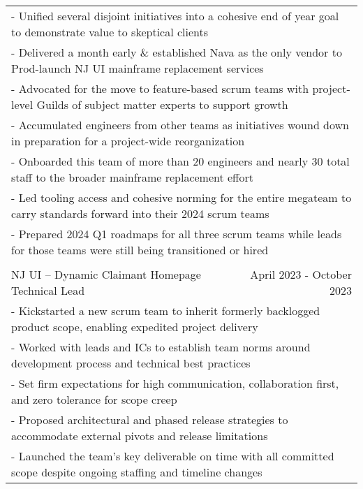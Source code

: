 \documentclass[letterpaper]{article}
\begin{document}
\begin{center}
\begin{tabular}{p{}p{}r}
			  \multicolumn{3}{p{\textwidth}}{\quad\quad - Unified several disjoint initiatives into a cohesive end of year goal to demonstrate value to skeptical clients} \\
			  \multicolumn{3}{p{\textwidth}}{\quad\quad - Delivered a month early \& established Nava as the only vendor to Prod-launch NJ UI mainframe replacement services} \\
			  \multicolumn{3}{p{\textwidth}}{\quad\quad - Advocated for the move to feature-based scrum teams with project-level Guilds of subject matter experts to support growth} \\
			  \multicolumn{3}{p{\textwidth}}{\quad\quad - Accumulated engineers from other teams as initiatives wound down in preparation for a project-wide reorganization} \\
			  \multicolumn{3}{p{\textwidth}}{\quad\quad - Onboarded this team of more than 20 engineers and nearly 30 total staff to the broader mainframe replacement effort} \\
			  \multicolumn{3}{p{\textwidth}}{\quad\quad - Led tooling access and cohesive norming for the entire megateam to carry standards forward into their 2024 scrum teams} \\
			  \multicolumn{3}{p{\textwidth}}{\quad\quad - Prepared 2024 Q1 roadmaps for all three scrum teams while leads for those teams were still being transitioned or hired}
		  \\
		  \\		%
			  \multicolumn{2}{p{0.5\textwidth}}{\quad NJ UI -- Dynamic Claimant Homepage Technical Lead}
			  &
			  {April 2023 - October 2023 \quad\quad\quad\quad}
		  \\
			  \multicolumn{3}{p{\textwidth}}{\quad\quad - Kickstarted a new scrum team to inherit formerly backlogged product scope, enabling expedited project delivery} \\
			  \multicolumn{3}{p{\textwidth}}{\quad\quad - Worked with leads and ICs to establish team norms around development process and technical best practices} \\
			  \multicolumn{3}{p{\textwidth}}{\quad\quad - Set firm expectations for high communication, collaboration first, and zero tolerance for scope creep} \\
			  \multicolumn{3}{p{\textwidth}}{\quad\quad - Proposed architectural and phased release strategies to accommodate external pivots and release limitations} \\
			  \multicolumn{3}{p{\textwidth}}{\quad\quad - Launched the team's key deliverable on time with all committed scope despite ongoing staffing and timeline changes}


\end{tabular}
\end{center}
\end{document}
